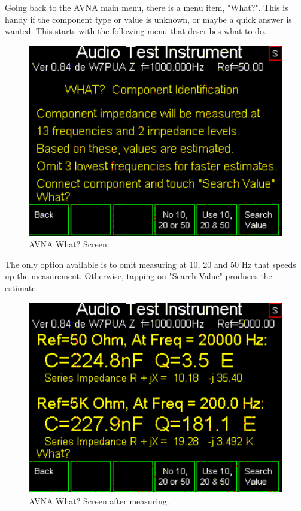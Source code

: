 Going back to the AVNA main menu, there is a menu item, "\textsf{What?}".  This is handy if the component type or value is unknown, or maybe a quick answer is wanted.  This starts with the following menu that describes what to do.
\begin{figure}[H]
\begin{center}
\includegraphics[scale=0.75]{./images/AVNA_012.pdf}
\caption{AVNA What? Screen.}
\label{AVNA_012-label}
\end{center}
\end{figure}
%
The only option available is to omit measuring at 10, 20 and 50 Hz that speeds up the measurement. Otherwise, tapping on "\textsf{Search Value}" produces the estimate:
\begin{figure}[H]
\begin{center}
\includegraphics[scale=0.75]{./images/AVNA_013.pdf}
\caption{AVNA What? Screen after measuring.}
\label{AVNA_013-label}
\end{center}
\end{figure}
